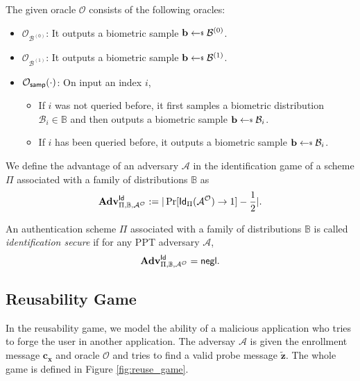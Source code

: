 The given oracle $\mathcal{O}$ consists of the following oracles:

\begin{itemize}
	\item $\mathcal{O}_{\mathcal{B}^{(0)}}$: It outputs a biometric sample $\mathbf{b} \getsdollar \mathcal{B}^{(0)}$.

	\item $\mathcal{O}_{\mathcal{B}^{(1)}}$: It outputs a biometric sample $\mathbf{b} \getsdollar \mathcal{B}^{(1)}$.

	\item $\mathcal{O}_{\sf samp}(\cdot)$: On input an index $i$,
	\begin{itemize}
		\item If $i$ was not queried before, it first samples a biometric distribution $\mathcal{B}_i \in \mathbb{B}$ and then outputs a biometric sample $\mathbf{b} \getsdollar \mathcal{B}_i$.
		\item If $i$ has been queried before, it outputs a biometric sample $\mathbf{b} \getsdollar \mathcal{B}_i$.
	\end{itemize}
	
\end{itemize}

We define the advantage of an adversary $\mathcal{A}$ in the identification game of a scheme $\Pi$ associated with a family of distributions $\mathbb{B}$ as
\[
	\mathbf{Adv}^{\sf Id}_{\Pi, \mathbb{B}, \mathcal{A}^\mathcal{O}} := |\Pr[{\sf Id}_{\Pi}(\mathcal{A}^\mathcal{O}) \to 1] - \frac{1}{2}|.
\]

An authentication scheme $\Pi$ associated with a family of distributions $\mathbb{B}$ is called \emph{identification secure} if for any PPT adversary $\mathcal{A}$,
\[
	\mathbf{Adv}^{\sf Id}_{\Pi, \mathbb{B}, \mathcal{A}^\mathcal{O}} = \mathsf{negl}.
\]


\subsection{Reusability Game}
\label{sec:reuse_game}

In the reusability game, we model the ability of a malicious application who tries to forge the user in another application. The adversay $\mathcal{A}$ is given the enrollment message $\mathbf{c_x}$ and oracle $\mathcal{O}$ and tries to find a valid probe message $\mathbf{\tilde{z}}$. The whole game is defined in Figure \ref{fig:reuse_game}.

